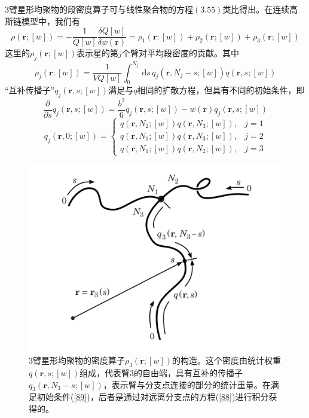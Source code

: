 $3$臂星形均聚物的段密度算子可与线性聚合物的方程$(3.55)$类比得出。在连续高斯链模型中，我们有
\begin{equation}
\rho(\mathbf{r};[w])=-\frac{1}{Q[w]}\frac{\delta Q[w]}{\delta w(\mathbf{r})}=\rho _1(\mathbf{r};[w])+\rho _2(\mathbf{r};[w])+\rho _3(\mathbf{r};[w])
\end{equation}
这里的$\rho _j(\mathbf{r};[w])$表示星的第$j$个臂对平均段密度的贡献。其中
\begin{equation}
\rho _{j}(\mathbf{r};[w])=\frac{1}{VQ[w]} \int_{0}^{N_j}\, \mathrm{d}s\,q_{j}(\mathbf{r},N_{j}-s;[w])q(\mathbf{r},s;[w]) \label{87}
\end{equation}
“互补传播子”$q_{j}(\mathbf{r},s;[w])$满足与$q$相同的扩散方程，但具有不同的初始条件，即
\begin{equation}
\frac{\partial}{\partial s}q_j(\mathbf{r},s;[w])=\frac{b^2}{6}q_j(\mathbf{r},s;[w])-w(\mathbf{r})q_j(\mathbf{r},s;[w]) \label{88}
\end{equation}
\begin{equation}
q_j(\mathbf{r},0;[w])=
\begin{cases}
q(\mathbf{r},N_2;[w])q(\mathbf{r},N_3;[w]), & j=1 \\
q(\mathbf{r},N_1;[w])q(\mathbf{r},N_3;[w]), & j=2 \\
q(\mathbf{r},N_1;[w])q(\mathbf{r},N_2;[w]), & j=3  \label{89}
\end{cases}
\end{equation}

\begin{figure}[H]
\centering
\includegraphics[scale=0.7]{./figures/35.png}
\caption{$3$臂星形均聚物的密度算子$\rho _3(\mathbf{r};[w])$的构造。这个密度由统计权重$q(\mathbf{r},s;[w])$组成，代表臂$3$的自由端，具有互补的传播子$q_3(\mathbf{r},N_3-s;[w])$，表示臂与分支点连接的部分的统计重量。在满足初始条件(\ref{89})，后者是通过对远离分支点的方程(\ref{88})进行积分获得的。}
\label{三臂星形图像}
\end{figure}

